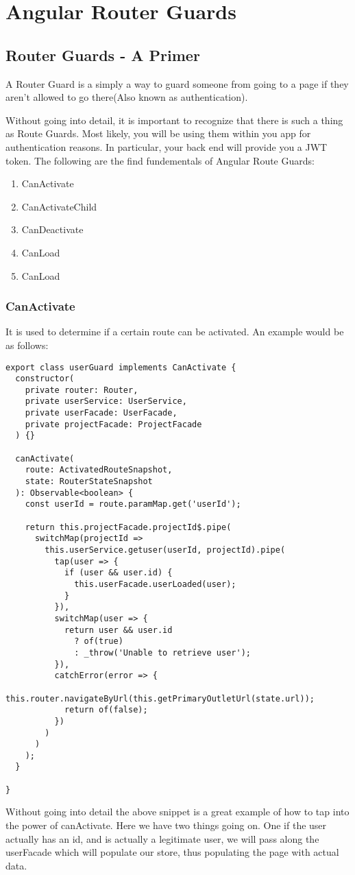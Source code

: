 \maketitle{}
\section{ Angular Router Guards }

\subsection{ Router Guards - A Primer }
A Router Guard is a simply a way to guard someone from going to a page if they
aren't allowed to go there(Also known as authentication).

Without going into detail, it is important to recognize that there is such a
thing as Route Guards. Most likely, you will be using them within you app
for authentication reasons. In particular, your back end will provide you a JWT
token. The following are the find fundementals of Angular Route Guards:
\begin{enumerate}
  \item CanActivate
  \item CanActivateChild
  \item CanDeactivate
  \item CanLoad
  \item CanLoad
\end{enumerate}

\subsubsection{ CanActivate }
It is used to determine if a certain route can be activated. An example would
be as follows:
\begin{lstlisting}
export class userGuard implements CanActivate {
  constructor(
    private router: Router,
    private userService: UserService,
    private userFacade: UserFacade,
    private projectFacade: ProjectFacade
  ) {}

  canActivate(
    route: ActivatedRouteSnapshot,
    state: RouterStateSnapshot
  ): Observable<boolean> {
    const userId = route.paramMap.get('userId');

    return this.projectFacade.projectId$.pipe(
      switchMap(projectId =>
        this.userService.getuser(userId, projectId).pipe(
          tap(user => {
            if (user && user.id) {
              this.userFacade.userLoaded(user);
            }
          }),
          switchMap(user => {
            return user && user.id
              ? of(true)
              : _throw('Unable to retrieve user');
          }),
          catchError(error => {
            this.router.navigateByUrl(this.getPrimaryOutletUrl(state.url));
            return of(false);
          })
        )
      )
    );
  }

}
\end{lstlisting}
Without going into detail the above snippet is a great example of how to tap
into the power of canActivate. Here we have two things going on. One if the user
actually has an id, and is actually a legitimate user, we will pass along the
userFacade which will populate our store, thus populating the page with actual
data. 

